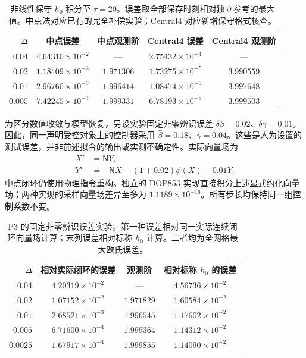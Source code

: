 \begin{table}[t]
\centering
\caption{非线性保守 $h_0$ 积分至 $\tau=20$。误差取全部保存时刻相对独立参考的最大值。中点法对应已有的完全补偿实验；Central4 对应新增保守格式核查。}
\label{num:nonlinear-order}
\begin{tabular}{rcccc}
\toprule
$\Delta$ & 中点误差 & 中点观测阶 & Central4 误差 & Central4 观测阶\\
\midrule
$0.04$ & $4.64310\times10^{-2}$ & --- & $2.75432\times10^{-4}$ & --- \\
$0.02$ & $1.18409\times10^{-2}$ & $1.971306$ & $1.73275\times10^{-5}$ & $3.990559$ \\
$0.01$ & $2.96760\times10^{-3}$ & $1.996414$ & $1.08474\times10^{-6}$ & $3.997648$ \\
$0.005$ & $7.42245\times10^{-4}$ & $1.999331$ & $6.78193\times10^{-8}$ & $3.999503$ \\
\bottomrule
\end{tabular}
\end{table}

为区分数值收敛与模型恢复，另设实验固定非零辨识误差 $\delta\beta=0.02$、$\delta\gamma=0.01$。因此，同一声明受控对象上的控制器采用 $\widehat\beta=0.18$、$\widehat\gamma=0.04$。这些是人为设置的测试误差，并非前述拟合的输出或实测不确定性。实际向量场为
\begin{equation}
 \begin{split}
 X'&=\mathsf NY,\\
 Y'&=-\mathsf NX-(1+0.02)\phi(X)-0.01Y.
 \end{split}
 \label{num:fixed-error-field}
\end{equation}
中点闭环仍使用物理指令重构。独立的 DOP853 实现直接积分上述显式约化向量场；两种实现的采样向量场差异至多为 $1.1189\times10^{-16}$。所有步长均保持同一组控制系数不变。

\begin{table}[t]
\centering
\caption{P3 的固定非零辨识误差实验。第一种误差相对同一实际连续闭环向量场计算；末列误差相对标称 $h_0$ 计算。二者均为全网格最大欧氏误差。}
\label{num:closed-convergence}
\begin{tabular}{rccc}
\toprule
$\Delta$ & 相对实际闭环的误差 & 观测阶 & 相对标称 $h_0$ 的误差\\
\midrule
$0.04$ & $4.20319\times10^{-2}$ & --- & $4.56736\times10^{-2}$ \\
$0.02$ & $1.07152\times10^{-2}$ & $1.971829$ & $1.60584\times10^{-2}$ \\
$0.01$ & $2.68521\times10^{-3}$ & $1.996545$ & $1.17602\times10^{-2}$ \\
$0.005$ & $6.71600\times10^{-4}$ & $1.999364$ & $1.14312\times10^{-2}$ \\
$0.0025$ & $1.67917\times10^{-4}$ & $1.999855$ & $1.14090\times10^{-2}$ \\
\bottomrule
\end{tabular}
\end{table}

